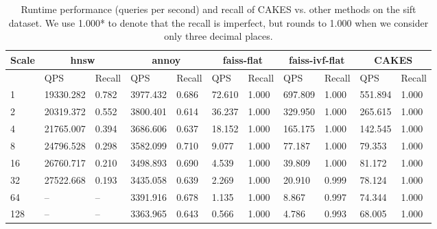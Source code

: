 \begin{table}[!t]
    \caption{Runtime performance (queries per second) and recall of CAKES vs. other methods on the sift dataset. We use 1.000* to denote that the recall is imperfect, but rounds to 1.000 when we consider only three decimal places.}
    \label{table:results:ann-fashion}
    \vskip 0.15in
    \begin{center}
        \begin{small}
            \begin{sc}
                \begin{tabular}{|l|p{1cm}|p{1cm}|p{1cm}|p{1cm}|p{1cm}|p{1cm}|p{1cm}|p{1cm}|p{1cm}|p{1cm}|}
                    \hline
                    \textbf{Scale}  & \multicolumn{2}{|c|}{\textbf{hnsw}}  & \multicolumn{2}{|c|}{\textbf{annoy}} & \multicolumn{2}{|c|}{\textbf{faiss-flat}} & \multicolumn{2}{|c|}{\textbf{faiss-ivf-flat}}  & \multicolumn{2}{|c|}{\textbf{CAKES}} \\
                    \hline
                    &             QPS & Recall        & QPS & Recall      & QPS & Recall       & QPS & Recall    & QPS & Recall    \\
                    \hline
                    1 & 19330.282 & 0.782 & 3977.432 & 0.686 & 72.610 & 1.000 & 697.809 & 1.000 & 551.894 & 1.000 \\
                    \hline
                    2 & 20319.372 & 0.552 & 3800.401 & 0.614 & 36.237 & 1.000 & 329.950 & 1.000 & 265.615 & 1.000 \\
                    \hline
                    4 & 21765.007 & 0.394 & 3686.606 & 0.637 & 18.152 & 1.000 & 165.175 & 1.000 & 142.545 & 1.000 \\
                    \hline
                    8 & 24796.528 & 0.298 & 3582.099 & 0.710 & 9.077 & 1.000 & 77.187 & 1.000 & 79.353 & 1.000 \\
                    \hline
                    16 & 26760.717 & 0.210 & 3498.893 & 0.690 & 4.539 & 1.000 & 39.809 & 1.000 & 81.172 & 1.000 \\
                    \hline
                    32 & 27522.668 & 0.193 & 3435.058 & 0.639 & 2.269 & 1.000 & 20.910 & 0.999 & 78.124 & 1.000 \\
                    \hline
                    64 & -- & -- & 3391.916 & 0.678 & 1.135 & 1.000 & 8.867 & 0.997 & 74.344 & 1.000 \\
                    \hline
                    128 & -- & -- & 3363.965 & 0.643 & 0.566 & 1.000 & 4.786 & 0.993 & 68.005 & 1.000 \\
                    \hline
                \end{tabular}
            \end{sc}
        \end{small}
    \end{center}
    \vskip -0.1in
\end{table}


